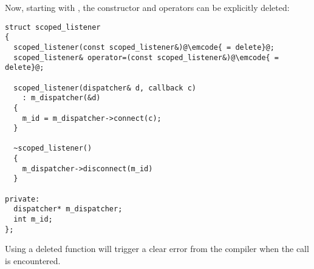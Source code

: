 Now, starting with , the constructor and operators can be
explicitly deleted:

\begin{lstlisting}
struct scoped_listener
{
  scoped_listener(const scoped_listener&)@\emcode{ = delete}@;
  scoped_listener& operator=(const scoped_listener&)@\emcode{ = delete}@;

  scoped_listener(dispatcher& d, callback c)
    : m_dispatcher(&d)
  {
    m_id = m_dispatcher->connect(c);
  }

  ~scoped_listener()
  {
    m_dispatcher->disconnect(m_id)
  }

private:
  dispatcher* m_dispatcher;
  int m_id;
};
\end{lstlisting}

Using a deleted function will trigger a clear error from the compiler
when the call is encountered.
